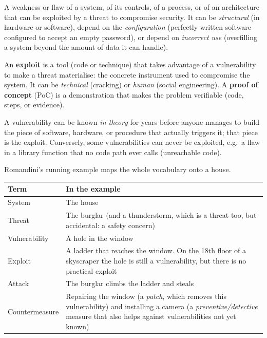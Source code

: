 \begin{definition}[Vulnerability]
A weakness or flaw of a system, of its controls, of a process, or of an architecture that can be exploited by a threat to compromise security. It can be \emph{structural} (in hardware or software), depend on the \emph{configuration} (perfectly written software configured to accept an empty password), or depend on \emph{incorrect use} (overfilling a system beyond the amount of data it can handle).
\end{definition}

\begin{definition}
An \textbf{exploit} is a tool (code or technique) that takes advantage of a vulnerability to make a threat materialise: the concrete instrument used to compromise the system. It can be \emph{technical} (cracking) or \emph{human} (social engineering). A \textbf{proof of concept} (PoC) is a demonstration that makes the problem verifiable (code, steps, or evidence).
\end{definition}

\begin{remark}
A vulnerability can be known \emph{in theory} for years before anyone manages to build the piece of software, hardware, or procedure that actually triggers it; that piece is the exploit. Conversely, some vulnerabilities can never be exploited, e.g.\ a flaw in a library function that no code path ever calls (unreachable code).
\end{remark}

\begin{example}
Romandini's running example maps the whole vocabulary onto a house.
\begin{center}
\begin{tabularx}{0.9\textwidth}{@{}l X@{}}
\toprule
Term & In the example \\
\midrule
System          & The house \\
Threat          & The burglar (and a thunderstorm, which is a threat too, but accidental: a safety concern) \\
Vulnerability   & A hole in the window \\
Exploit         & A ladder that reaches the window. On the 18th floor of a skyscraper the hole is still a vulnerability, but there is no practical exploit \\
Attack          & The burglar climbs the ladder and steals \\
Countermeasure  & Repairing the window (a \emph{patch}, which removes this vulnerability) and installing a camera (a \emph{preventive/detective} measure that also helps against vulnerabilities not yet known) \\
\bottomrule
\end{tabularx}
\end{center}
\end{example}

